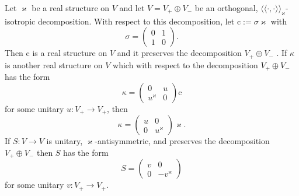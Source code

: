 \documentclass{article}
\newcommand{\assign}{:=}
\newcommand{\cdummy}{\cdot}
\newcommand{\llangle}{{\langle\!\langle}}
\newcommand{\rrangle}{{\rangle\!\rangle}}
\begin{document}
\begin{remark}
  Let $\varkappa$ be a real structure on $V$ and let $V = V_+ \oplus V_-$ be
  an orthogonal, $\llangle \cdummy, \cdummy \rrangle_{\varkappa}$-isotropic
  decomposition. With respect to this decomposition, let $\mathrm{c} \assign
  \sigma \varkappa$ with
  \[ \sigma = \left( \begin{array}{ll}
       0 & 1\\
       1 & 0
     \end{array} \right) . \]
  Then $\mathrm{c}$ is a real structure on $V$ and it preserves the
  decomposition $V_+ \oplus V_-$ . If $\kappa$ is another real structure on
  $V$ which with respect to the decomposition $V_+ \oplus V_-$ has the form
  \[ \kappa = \left(\begin{array}{cc}
       0 & u\\
       u^{\varkappa} & 0
     \end{array}\right) \mathrm{c} \]
  for some unitary $u : V_+ \rightarrow V_+$, then
  \[ \kappa = \left(\begin{array}{cc}
       u & 0\\
       0 & u^{\varkappa}
     \end{array}\right) \varkappa . \]
  If $S : V \rightarrow V$ is unitary, $\varkappa$-antisymmetric, and
  preserves the decomposition $V_+ \oplus V_-$ then $S$ has the form
  \[ S = \left(\begin{array}{cc}
       v & 0\\
       0 & - v^{\varkappa}
     \end{array}\right) \]
  for some unitary $v : V_+ \rightarrow V_+$.
\end{remark}
\end{document}
